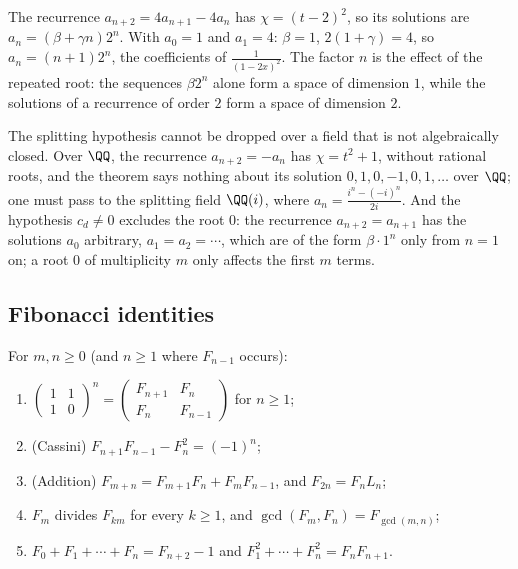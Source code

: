 \begin{example}\label{generating-functions:example-double-root}
The recurrence $a_{n+2} = 4a_{n+1} - 4a_n$ has $\chi = (t - 2)^2$, so its solutions are $a_n = (\beta + \gamma n)2^n$. With $a_0 = 1$ and $a_1 = 4$: $\beta = 1$, $2(1 + \gamma) = 4$, so
$a_n = (n + 1)2^n$, the coefficients of $\frac{1}{(1 - 2x)^2}$. The factor $n$ is the effect of the repeated root: the sequences $\beta2^n$ alone form a space of dimension $1$, while the solutions of a
recurrence of order $2$ form a space of dimension $2$.
\end{example}

\begin{counterexample}\label{generating-functions:counterexample-splitting}
The splitting hypothesis cannot be dropped over a field that is not algebraically closed. Over $\QQ$, the recurrence $a_{n+2} = -a_n$ has $\chi = t^2 + 1$, without rational roots, and the theorem says nothing about its solution
$0, 1, 0, -1, 0, 1, \ldots$ over $\QQ$; one must pass to the splitting field $\QQ(i)$, where $a_n = \frac{i^n - (-i)^n}{2i}$. And the hypothesis $c_d \neq 0$ excludes the root $0$: the recurrence $a_{n+2} = a_{n+1}$ has
the solutions $a_0$ arbitrary, $a_1 = a_2 = \cdots$, which are of the form $\beta \cdot 1^n$ only from $n = 1$ on; a root $0$ of multiplicity $m$ only affects the first $m$ terms.
\end{counterexample}

\subsection{Fibonacci identities}\label{generating-functions:subsection-fibonacci}

\begin{proposition}\label{generating-functions:proposition-fibonacci}
For $m, n \geq 0$ (and $n \geq 1$ where $F_{n-1}$ occurs):
\begin{enumerate}
\item $\begin{pmatrix}1 & 1\\ 1 & 0\end{pmatrix}^n = \begin{pmatrix}F_{n+1} & F_n\\ F_n & F_{n-1}\end{pmatrix}$ for $n \geq 1$;
\item (Cassini) $F_{n+1}F_{n-1} - F_n^2 = (-1)^n$;
\item (Addition) $F_{m+n} = F_{m+1}F_n + F_mF_{n-1}$, and $F_{2n} = F_nL_n$;
\item $F_m$ divides $F_{km}$ for every $k \geq 1$, and $\gcd(F_m, F_n) = F_{\gcd(m, n)}$;
\item $F_0 + F_1 + \cdots + F_n = F_{n+2} - 1$ and $F_1^2 + \cdots + F_n^2 = F_nF_{n+1}$.
\end{enumerate}
\end{proposition}

